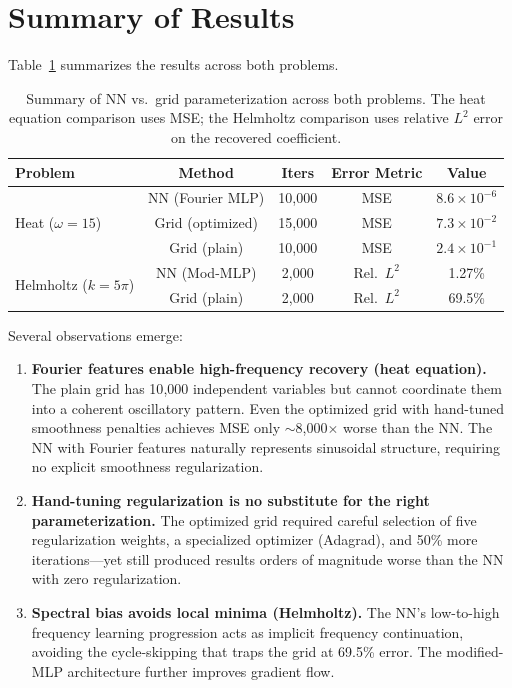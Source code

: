 \documentclass[11pt]{article}
\begin{document}
\section{Summary of Results}
\label{sec:summary}

Table~\ref{tab:summary} summarizes the results across both problems.

\begin{table}[htbp]
  \centering
  \caption{Summary of NN vs.\ grid parameterization across both problems. The heat equation comparison uses MSE; the Helmholtz comparison uses relative $L^2$ error on the recovered coefficient.}
  \label{tab:summary}
  \begin{tabular}{lcccc}
    \toprule
    \textbf{Problem} & \textbf{Method} & \textbf{Iters} & \textbf{Error Metric} & \textbf{Value} \\
    \midrule
    \multirow{3}{*}{Heat ($\omega = 15$)}
      & NN (Fourier MLP) & 10{,}000 & MSE & $8.6 \times 10^{-6}$ \\
      & Grid (optimized) & 15{,}000 & MSE & $7.3 \times 10^{-2}$ \\
      & Grid (plain)     & 10{,}000 & MSE & $2.4 \times 10^{-1}$ \\
    \midrule
    \multirow{2}{*}{Helmholtz ($k = 5\pi$)}
      & NN (Mod-MLP)     & 2{,}000  & Rel.\ $L^2$ & 1.27\% \\
      & Grid (plain)     & 2{,}000  & Rel.\ $L^2$ & 69.5\% \\
    \bottomrule
  \end{tabular}
\end{table}

Several observations emerge:

\begin{enumerate}
  \item \textbf{Fourier features enable high-frequency recovery (heat equation).} The plain grid has 10{,}000 independent variables but cannot coordinate them into a coherent oscillatory pattern. Even the optimized grid with hand-tuned smoothness penalties achieves MSE only $\sim$8{,}000$\times$ worse than the NN. The NN with Fourier features naturally represents sinusoidal structure, requiring no explicit smoothness regularization.

  \item \textbf{Hand-tuning regularization is no substitute for the right parameterization.} The optimized grid required careful selection of five regularization weights, a specialized optimizer (Adagrad), and 50\% more iterations---yet still produced results orders of magnitude worse than the NN with zero regularization.

  \item \textbf{Spectral bias avoids local minima (Helmholtz).} The NN's low-to-high frequency learning progression acts as implicit frequency continuation, avoiding the cycle-skipping that traps the grid at 69.5\% error. The modified-MLP architecture further improves gradient flow.
\end{enumerate}
\end{document}
